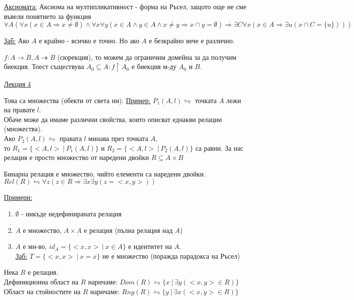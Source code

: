 \documentclass[fleqn, titlepage, 12pt]{report}
\begin{document}
\underline{Аксиомата:} Аксиома на мултипликативност - форма на Ръсел, защото още не сме въвели понятието за функция\\
$ \forall{A} ( \forall{x} (x \in A \Rightarrow x \neq \emptyset) \land \forall{x} \forall{y} (
x \in A \land y \in A \land x \neq y \Rightarrow x \cap y = \emptyset)
\Rightarrow \exists{C} \forall{x} (x \in A \Rightarrow  \exists{u} (x \cap C = \{ u\})))$
\bigbreak

\underline{Заб:} Ако $A$ е крайно - всичко е точно. Но ако $A$ е безкрайно вече е различно.
\bigbreak

$ f: A \rightarrow B, A \twoheadrightarrow B$ (сюрекция), то можем да ограничим домейна за да получим биекция.
Тоест съществува $A_0 \subseteq A : f \upharpoonright A_0$ е биекция м-ду $A_0$ и $B$.

\clearpage
\begin{center}
  \underline{\huge\normalfont Лекция 4}
\end{center}
\bigbreak

 Това са множества (обекти от света ни).
\bigbreak
\underline{Пример:} $P_1(A,l) \leftrightharpoons$ точката $ A $ лежи на правате $l$.\\
Обаче може да имаме различни свойства, които описват еднакви релации (множества).\\
Ако $P_2(A,l) \leftrightharpoons$ правата $l$ минава през точката $A$,\\
то $R_1 = \{<A,l>\ |\ P_1(A,l)\}$ и $R_2 = \{<A,l>\ |\ P_2(A,l)\}$ са равни.
За нас релация е просто множество от наредени двойки $R \subseteq A \times B$
\bigbreak

 Бинарна релация е множество, чийто елементи са наредени двойки.\\
$Rel(R) \leftrightharpoons \forall{z}(z \in R \Rightarrow \exists{x} \exists{y}(z = <x,y>))$
\bigbreak

\underline{Примери:}
\begin{enumerate}
  \item $ \emptyset$ - никъде недефинираната релация
  \item $A$ е множество, $A \times A$ е релация (пълна релация над $A$)
  \item $A$ е мн-во, $id_A = \{<x,x>\ |\ x \in A\}$ е идентитет на $A$.\\
    \underline{Заб:} $T = \{<x,x>\ |\ x = x\}$ не е множество (поражда парадокса на Ръсел)
\end{enumerate}
\bigbreak

 Нека $R$ е релация.\\
Дефиниционна област на $R$ наричаме: $Dom(R) \leftrightharpoons \{x\ |\ \exists{y}(<x,y> \in R)\}$\\
Област на стойностите на $R$ наричаме: $Rng(R) \leftrightharpoons \{y\ |\ \exists{x}(<x,y> \in R)\}$
\bigbreak
\end{document}

